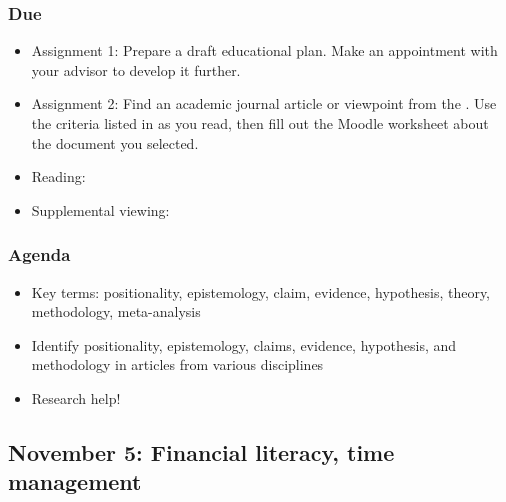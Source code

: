 \documentclass[12pt,article,oneside]{memoir}
\begin{document}
\subsubsection{Due}
\begin{itemize}
 \item Assignment 1: Prepare a draft educational plan.  Make an appointment with your advisor to develop it further.
 \item Assignment 2: Find an academic journal article or viewpoint from the .  Use the criteria listed in \cite{evaluation} as you read, then fill out the Moodle worksheet about the document you selected.
 \item Reading: \cite{evaluation}
 \item Supplemental viewing: \cite{gen-ed}
\end{itemize}


\subsubsection{Agenda}
\begin{itemize}
\item Key terms: positionality, epistemology, claim, evidence, hypothesis, theory, methodology, meta-analysis
\item Identify positionality, epistemology, claims, evidence, hypothesis, and methodology in articles from various disciplines
 \item Research help!
\end{itemize}




\subsection{November 5: Financial literacy, time management}
\end{document}
